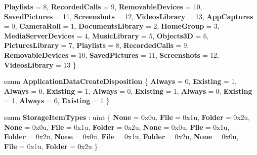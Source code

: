 \begin{DoxyCompactItemize}
{\bfseries Playlists} = 8, 
{\bfseries Recorded\+Calls} = 9, 
\newline
{\bfseries Removable\+Devices} = 10, 
{\bfseries Saved\+Pictures} = 11, 
{\bfseries Screenshots} = 12, 
{\bfseries Videos\+Library} = 13, 
\newline
{\bfseries App\+Captures} = 0, 
{\bfseries Camera\+Roll} = 1, 
{\bfseries Documents\+Library} = 2, 
{\bfseries Home\+Group} = 3, 
\newline
{\bfseries Media\+Server\+Devices} = 4, 
{\bfseries Music\+Library} = 5, 
{\bfseries Objects3D} = 6, 
{\bfseries Pictures\+Library} = 7, 
\newline
{\bfseries Playlists} = 8, 
{\bfseries Recorded\+Calls} = 9, 
{\bfseries Removable\+Devices} = 10, 
{\bfseries Saved\+Pictures} = 11, 
\newline
{\bfseries Screenshots} = 12, 
{\bfseries Videos\+Library} = 13
 \}
\item 
\mbox{\label{namespace_windows_1_1_storage_ad31753d0e1a55938e5b849af2661f220}} 
enum {\bfseries Application\+Data\+Create\+Disposition} \{ \newline
{\bfseries Always} = 0, 
{\bfseries Existing} = 1, 
{\bfseries Always} = 0, 
{\bfseries Existing} = 1, 
\newline
{\bfseries Always} = 0, 
{\bfseries Existing} = 1, 
{\bfseries Always} = 0, 
{\bfseries Existing} = 1, 
\newline
{\bfseries Always} = 0, 
{\bfseries Existing} = 1
 \}
\item 
\mbox{\label{namespace_windows_1_1_storage_afbbba3be392001933e27301572dd9adc}} 
enum {\bfseries Storage\+Item\+Types} \+: uint \{ \newline
{\bfseries None} = 0x0u, 
{\bfseries File} = 0x1u, 
{\bfseries Folder} = 0x2u, 
{\bfseries None} = 0x0u, 
\newline
{\bfseries File} = 0x1u, 
{\bfseries Folder} = 0x2u, 
{\bfseries None} = 0x0u, 
{\bfseries File} = 0x1u, 
\newline
{\bfseries Folder} = 0x2u, 
{\bfseries None} = 0x0u, 
{\bfseries File} = 0x1u, 
{\bfseries Folder} = 0x2u, 
\newline
{\bfseries None} = 0x0u, 
{\bfseries File} = 0x1u, 
{\bfseries Folder} = 0x2u
 \}
\item 
\mbox{\label{namespace_windows_1_1_storage_a47f58c5ed62127e58f4cd3b2e14d0bfb}} 

\end{DoxyCompactItemize}
